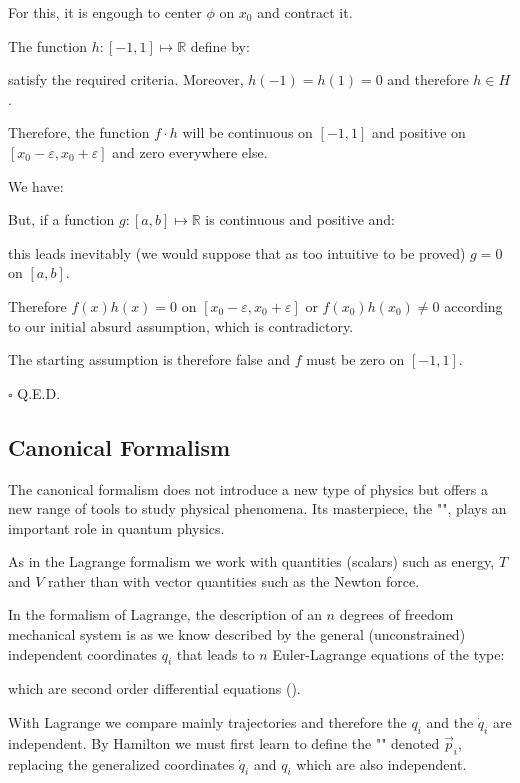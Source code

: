 \begin{dem}
	For this, it is engough to center $\phi$ on $x_0$ and contract it.

	The function $h:[-1,1]\mapsto \mathbb{R}$ define by:
	
	satisfy the required criteria. Moreover, $h(-1)=h(1)=0$ and therefore $h\in H$.

	Therefore, the function $f\cdot h$ will be continuous on $[-1,1]$ and positive on $[x_0-\varepsilon,x_0+\varepsilon]$ and zero everywhere else.

	We have:
		
	But, if a function $g:[a,b]\mapsto \mathbb{R}$ is continuous and positive and:
		
	this leads inevitably (we would suppose that as too intuitive to be proved) $g=0$ on $[a,b]$.
	
	Therefore $f(x)h(x)=0$ on $[x_0-\varepsilon,x_0+\varepsilon]$ or $f(x_0)h(x_0)\neq 0$ according to our initial absurd assumption, which is contradictory.

	The starting assumption is therefore false and $f$ must be zero on $[-1,1]$.
	\begin{flushright}
		$\square$  Q.E.D.
	\end{flushright}
	\end{dem}
	
	\subsection{Canonical Formalism}
	The canonical formalism does not introduce a new type of physics but offers a new range of tools to study physical phenomena. Its masterpiece, the "", plays an important role in quantum physics.

	As in the Lagrange formalism we work with quantities (scalars) such as energy, $T$ and $V$ rather than with vector quantities such as the Newton force.

	In the formalism of Lagrange, the description of an $n$ degrees of freedom mechanical system is as we know described by the general (unconstrained) independent coordinates $q_i$ that leads to $n$ Euler-Lagrange equations of the type:
	
	which are  second order differential equations ().
	
	With Lagrange we compare mainly trajectories and therefore the $q_i$ and the $\dot{q}_i$ are independent. By Hamilton we must first learn to define the "" denoted $\vec{p}_i$, replacing the generalized coordinates $\dot{q}_i$ and $q_i$ which are also independent.
	
